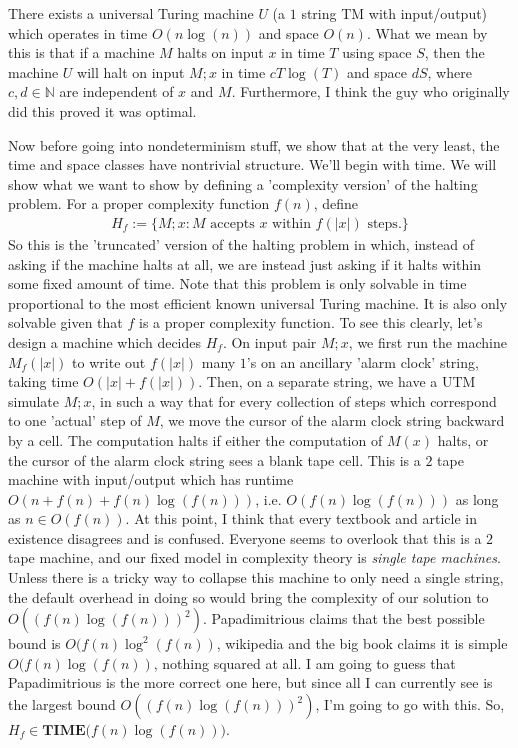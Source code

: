 \begin{lemma}
	There exists a universal Turing machine $U$ (a $1$ string TM with input/output) which operates in time $O(n\log(n))$ and space $O(n)$. What we mean by this is that if a machine $M$ halts on input $x$ in time $T$ using space $S$, then the machine $U$ will halt on input $M;x$ in time $cT\log(T)$ and space $dS$, where $c,d \in \mathbb{N}$ are independent of $x$ and $M$. Furthermore, I think the guy who originally did this proved it was optimal. 
\end{lemma}
Now before going into nondeterminism stuff, we show that at the very least, the time and space classes have nontrivial structure. We'll begin with time. We will show what we want to show by defining a 'complexity version' of the halting problem. For a proper complexity function $f(n)$, define 
\begin{align}
	H_f := \{M;x: \textrm{$M$ accepts $x$ within $f(|x|)$ steps.} \}
\end{align}
So this is the 'truncated' version of the halting problem in which, instead of asking if the machine halts at all, we are instead just asking if it halts within some fixed amount of time. Note that this problem is only solvable in time proportional to the most efficient known universal Turing machine. It is also only solvable given that $f$ is a proper complexity function. To see this clearly, let's design a machine which decides $H_f$. On input pair $M;x$, we first run the machine $M_f(|x|)$ to write out $f(|x|)$ many $1$'s on an ancillary 'alarm clock' string, taking time $O(|x|+f(|x|))$. Then, on a separate string, we have a UTM simulate $M;x$, in such a way that for every collection of steps which correspond to one 'actual' step of $M$, we move the cursor of the alarm clock string backward by a cell. The computation halts if either the computation of $M(x)$ halts, or the cursor of the alarm clock string sees a blank tape cell. This is a $2$ tape machine with input/output which has runtime $O(n+f(n)+f(n)\log(f(n)))$, i.e. $O(f(n)\log(f(n)))$ as long as $n \in O(f(n))$. At this point, I think that every textbook and article in existence disagrees and is confused. Everyone seems to overlook that this is a $2$ tape machine, and our fixed model in complexity theory is \textit{single tape machines}. Unless there is a tricky way to collapse this machine to only need a single string, the default overhead in doing so would bring the complexity of our solution to $O((f(n)\log(f(n)))^2)$. Papadimitrious claims that the best possible bound is $O(f(n)\log^2(f(n))$, wikipedia and the big book claims it is simple $O(f(n)\log(f(n))$, nothing squared at all. I am going to guess that Papadimitrious is the more correct one here, but since all I can currently see is the largest bound $O((f(n)\log(f(n)))^2)$, I'm going to go with this. So, $H_f \in \textbf{TIME($f(n)\log(f(n))$)}$.
